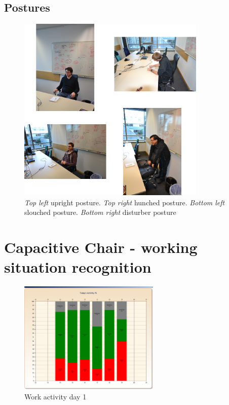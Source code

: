 \subsection{Postures}
\begin{figure}[ht]
\centering
\includegraphics[width=0.8\textwidth]{images/app_eval_chair1}
\caption{\emph{Top left} upright posture. \emph{Top right} hunched posture. \emph{Bottom left} slouched posture. \emph{Bottom right} disturber posture}
\label{fig:disc_unob_elec}
\end{figure}

\section{Capacitive Chair - working situation recognition}
\begin{figure}[ht]
\centering
\includegraphics[width=0.6\textwidth]{images/workact_day1}
\caption{Work activity day 1}
\label{fig:workact_day1}
\end{figure}

